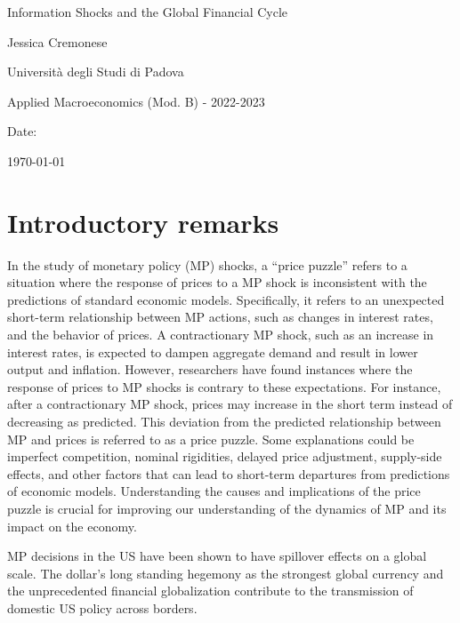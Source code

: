\documentclass[10pt,a4paper,draft]{article}
\begin{document}
\begin{titlepage}
    \centering
    \vspace*{2cm}
    {\LARGE Information Shocks and the Global Financial Cycle \par}
    \vspace{2cm}
    {\large Jessica Cremonese \par}
    \vspace{1cm}
    {\large Università degli Studi di Padova \par}
    \vspace{1cm}
    {\large Applied Macroeconomics (Mod. B) - 2022-2023 \par}
    \vspace{1cm}
    {\large Date: \par}
    {\large \today \par}
\end{titlepage}


\newpage
\section{Introductory remarks}

In the study of monetary policy (MP) shocks, a \enquote{price puzzle} refers to a situation where the response of prices to a MP shock is inconsistent with the predictions of standard economic models. Specifically, it refers to an unexpected short-term relationship between MP actions, such as changes in interest rates, and the behavior of prices. A contractionary MP shock, such as an increase in interest rates, is expected to dampen aggregate demand and result in lower output and inflation. However, researchers have found instances where the response of prices to MP shocks is contrary to these expectations. For instance, after a contractionary MP shock, prices may increase in the short term instead of decreasing as predicted. This deviation from the predicted relationship between MP and prices is referred to as a price puzzle. Some explanations could be imperfect competition, nominal rigidities, delayed price adjustment, supply-side effects, and other factors that can lead to short-term departures from predictions of economic models. Understanding the causes and implications of the price puzzle is crucial for improving our understanding of the dynamics of MP and its impact on the economy.


MP decisions in the US have been shown to have spillover effects on a global scale. The dollar's long standing hegemony as the strongest global currency and the unprecedented financial globalization contribute to the transmission of domestic US policy across borders. 
\end{document}
